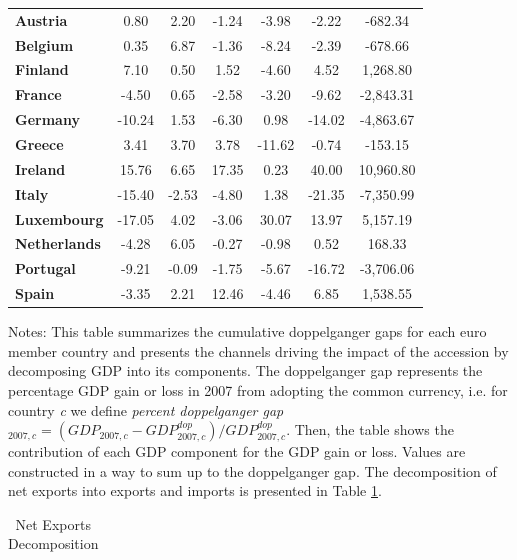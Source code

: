\documentclass[12pt]{article}
\newcommand{\annote}[1]{\parbox{\textwidth}{\renewcommand{\baselinestretch}{1.0}\vspace{12pt} \small Notes: #1}}
\begin{document}
\begin{appendices}
\begin{table}[htbp!]
\begin{tabular}{l|cccc|cc}
\textbf{Austria} &      0.80 &      2.20 &     -1.24 &     -3.98 &     -2.22 &   -682.34 \\
[1em]
\textbf{Belgium} &      0.35 &      6.87 &     -1.36 &     -8.24 &     -2.39 &   -678.66 \\  
[1em]
\textbf{Finland} &      7.10 &      0.50 &      1.52 &     -4.60 &      4.52 &   1,268.80 \\
[1em]
\textbf{France} &     -4.50 &      0.65 &     -2.58 &     -3.20 &     -9.62 &  -2,843.31 \\
[1em]
\textbf{Germany} &    -10.24 &      1.53 &     -6.30 &      0.98 &    -14.02 &  -4,863.67 \\
[1em]
\textbf{Greece} &      3.41 &      3.70 &      3.78 &    -11.62 &     -0.74 &   -153.15 \\
[1em]
\textbf{Ireland} &     15.76 &      6.65 &     17.35 &      0.23 &     40.00 &  10,960.80 \\  
[1em]
\textbf{Italy} &    -15.40 &     -2.53 &     -4.80 &      1.38 &    -21.35 &  -7,350.99 \\
[1em]
\textbf{Luxembourg} &    -17.05 &      4.02 &     -3.06 &     30.07 &     13.97 &   5,157.19 \\  
[1em]
\textbf{Netherlands} &     -4.28 &      6.05 &     -0.27 &     -0.98 &      0.52 &    168.33 \\  
[1em]
\textbf{Portugal} &     -9.21 &     -0.09 &     -1.75 &     -5.67 &    -16.72 &  -3,706.06 \\
[1em]
\textbf{Spain}  &     -3.35 &      2.21 &     12.46 &     -4.46 &      6.85 &   1,538.55 \\ 

\bottomrule
\end{tabular}
\annote{This table summarizes the cumulative doppelganger gaps for each euro member country and presents the channels driving the impact of the accession by decomposing GDP into its components. The doppelganger gap represents the percentage GDP gain or loss in 2007 from adopting the common currency, i.e. for country \textit{c} we define \textit{percent doppelganger gap}$_{2007,c}= (GDP_{2007,c} - GDP_{2007,c}^{dop})/GDP_{2007,c}^{dop}$. Then, the table shows the contribution of each GDP component for the GDP gain or loss. Values are constructed in a way to sum up to the doppelganger gap. The decomposition of net exports into exports and imports is presented in Table \ref{T_Decomposition_NX}.}
\end{table}

\begin{table}[h!]
\scriptsize
\caption{\label{T_Decomposition_NX} Net Exports Decomposition} \centering
\begin{tabular}{l|c|cc} \toprule


\end{tabular}
\end{table}
\end{appendices}
\end{document}
